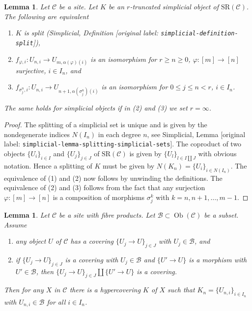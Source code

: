 \documentclass[10pt,a4paper]{article}
\theoremstyle{plain}
\newtheorem{lemma}[subsection]{Lemma}
\theoremstyle{definition}
\theoremstyle{remark}
\numberwithin{equation}{subsection}
\def\Ob{\mathop{\mathrm{Ob}}\nolimits}
\begin{document}
\begin{lemma}
\label{lemma-split}
Let $\mathcal{C}$ be a site. Let $K$ be an $r$-truncated simplicial object
of $\text{SR}(\mathcal{C})$. The following are equivalent
\begin{enumerate}
\item $K$ is split (Simplicial, Definition \textnormal{[original label: \nolinkurl{simplicial-definition-split}]}),
\item $f_{\varphi, i} : U_{n, i} \to U_{m, \alpha(\varphi)(i)}$
is an isomorphism for $r \geq n \geq 0$,
$\varphi : [m] \to [n]$ surjective, $i \in I_n$, and
\item $f_{\sigma^n_j, i} : U_{n, i} \to U_{n + 1, \alpha(\sigma^n_j)(i)}$
is an isomorphism for $0 \leq j \leq n < r$, $i \in I_n$.
\end{enumerate}
The same holds for simplicial objects if in (2) and (3)
we set $r = \infty$.
\end{lemma}

\begin{proof}
The splitting of a simplicial set is unique and is given by
the nondegenerate indices $N(I_n)$ in each degree $n$, see
Simplicial, Lemma \textnormal{[original label: \nolinkurl{simplicial-lemma-splitting-simplicial-sets}]}.
The coproduct of two objects $\{U_i\}_{i \in I}$ and $\{U_j\}_{j \in J}$
of $\text{SR}(\mathcal{C})$ is given by $\{U_l\}_{l \in I \amalg J}$
with obvious notation. Hence a splitting of $K$ must be given by
$N(K_n) = \{U_i\}_{i \in N(I_n)}$. The equivalence of (1) and (2)
now follows by unwinding the definitions. The equivalence of (2)
and (3) follows from the fact that any surjection
$\varphi : [m] \to [n]$ is a composition of morphisms
$\sigma^k_j$ with $k = n, n + 1, \ldots, m - 1$.
\end{proof}

\begin{lemma}
\label{lemma-hypercovering-object}
Let $\mathcal{C}$ be a site with fibre products.
Let $\mathcal{B} \subset \Ob(\mathcal{C})$ be a subset.
Assume
\begin{enumerate}
\item any object $U$ of $\mathcal{C}$ has a covering
$\{U_j \to U\}_{j \in J}$ with $U_j \in \mathcal{B}$, and
\item if $\{U_j \to U\}_{j \in J}$ is a covering
with $U_j \in \mathcal{B}$ and $\{U' \to U\}$ is a morphism with
$U' \in \mathcal{B}$, then $\{U_j \to U\}_{j \in J} \amalg \{U' \to U\}$
is a covering.
\end{enumerate}
Then for any $X$ in $\mathcal{C}$ there is a hypercovering $K$
of $X$ such that $K_n = \{U_{n, i}\}_{i \in I_n}$
with $U_{n, i} \in \mathcal{B}$ for all $i \in I_n$.
\end{lemma}
\end{document}
